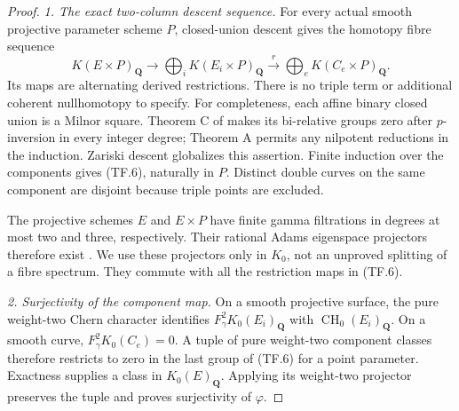 \begin{proof}
\emph{1. The exact two-column descent sequence.}
For every actual smooth projective parameter scheme $P$, closed-union
descent gives the homotopy fibre sequence
\begin{equation}
 K(E\times P)_{\mathbf Q}\longrightarrow
       \bigoplus_iK(E_i\times P)_{\mathbf Q}
   \xrightarrow{\ r\ }\bigoplus_eK(C_e\times P)_{\mathbf Q}.
                                                               \tag{TF.6}
\end{equation}
Its maps are alternating derived restrictions. There is no triple
term or additional coherent nullhomotopy to specify.
For completeness, each affine binary closed union is a Milnor square.
Theorem C of \citet[printed p.~30]{rootGeisserHesselholt2011} makes its
bi-relative groups zero after $p$-inversion in every integer degree;
Theorem A permits any nilpotent reductions in the induction.
Zariski descent \citep[Theorem 8.1 and proof, p.~367]
{D_ThomasonTrobaugh1990} globalizes this assertion. Finite induction
over the components gives (TF.6), naturally in $P$. Distinct double
curves on the same component are disjoint because triple points
are excluded.

The projective schemes $E$ and $E\times P$ have finite gamma
filtrations in degrees at most two and three, respectively.
Their rational Adams eigenspace projectors therefore exist
\citep[Chapter II, Proposition 4.9, Theorem 4.10, and
Remark 8.8.5]{D_Weibel2013KbookII}. We use these projectors only
in $K_0$, not an unproved splitting of a fibre spectrum.
They commute with all the restriction maps in (TF.6).

\emph{2. Surjectivity of the component map.}
On a smooth projective surface, the pure weight-two Chern character
identifies $F_\gamma^2K_0(E_i)_{\mathbf Q}$ with
$\operatorname{CH}_0(E_i)_{\mathbf Q}$. On a smooth curve,
$F_\gamma^2K_0(C_e)=0$. A tuple of pure weight-two component classes
therefore restricts to zero in the last group of (TF.6) for a point
parameter. Exactness supplies a class in $K_0(E)_{\mathbf Q}$.
Applying its weight-two projector preserves the tuple and proves
surjectivity of $\varphi$.


\end{proof}
